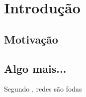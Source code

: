 \documentclass{abnt}
\begin{document}
\folhaderosto

\sumario

\chapter{Introdução}

\section{Motivação}



\section{Algo mais...}

Segundo , redes são fodas








\end{document}
